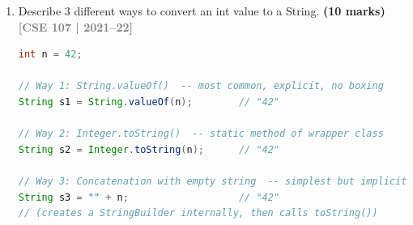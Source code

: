 \documentclass[12pt,a3paper]{article}
\newcommand{\yr}[1]{\hfill\textcolor{gray}{\small\textbf{[#1]}}}
\newcommand{\mk}[1]{\textcolor{orange!70!black}{\small\textbf{(#1 marks)}}}
\begin{document}
\begin{enumerate}
\begin{tcolorbox}[enhanced,breakable,ansbox,
  colback=cB!4,colframe=cB,boxrule=0.8pt,arc=5pt,
  title={\textbf{Answer --- Problems in \texttt{StaticTest}}},
  fonttitle=\bfseries\color{white},colbacktitle=cB]
\begin{enumerate}[label=\textbf{\arabic*.}]
  \item \textbf{Top-level class declared \texttt{static}:}
    A top-level class cannot be \texttt{static} in Java.  Only
    nested (inner) classes can be \texttt{static}.
\end{enumerate}

\textbf{Corrected code:}
\begin{lstlisting}[language=Java]
class StaticTest {                        // removed: static keyword
    static int x = 5, y;
    int z;
    { x = 5; z = 20; }
    static { y = x * 4; }                // removed: z = y

    int s1() { return x * y; }

    static void s2(int zVal) {            // pass z as parameter
        System.out.println("z = " + zVal);
    }

    public static void main(String[] args) {
        StaticTest obj = new StaticTest();
        System.out.println("s1() = " + obj.s1()); // call via object
        System.out.println("z = " + obj.z);        // access via object
        s2(obj.z);
    }
}
\end{lstlisting}

\end{tcolorbox}

\item Describe 3 different ways to convert an int value to a String. \mk{10}
\yr{CSE 107 | 2021--22}

\begin{tcolorbox}[enhanced,breakable,ansbox,
  colback=cB!4,colframe=cB,boxrule=0.8pt,arc=5pt,
  title={\textbf{Answer --- Converting \texttt{int} to \texttt{String}}},
  fonttitle=\bfseries\color{white},colbacktitle=cB]

\begin{lstlisting}[language=Java]
int n = 42;

// Way 1: String.valueOf()  -- most common, explicit, no boxing
String s1 = String.valueOf(n);        // "42"

// Way 2: Integer.toString()  -- static method of wrapper class
String s2 = Integer.toString(n);      // "42"

// Way 3: Concatenation with empty string  -- simplest but implicit
String s3 = "" + n;                   // "42"
// (creates a StringBuilder internally, then calls toString())
\end{lstlisting}


\end{tcolorbox}
\end{enumerate}
\end{document}
